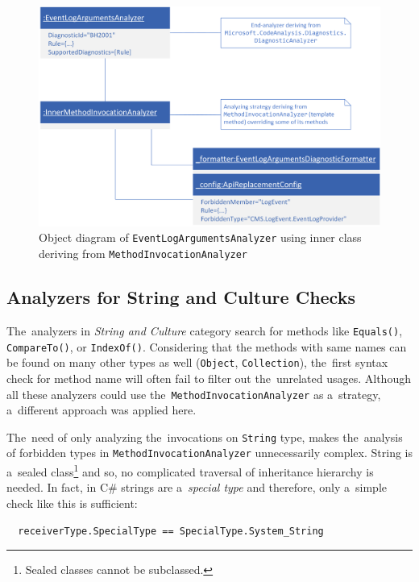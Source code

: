 \documentclass[
  digital, %
  table,   %
  lof,     %
  lot,     %
  oneside,
]{fithesis3}
\begin{document}
\begin{figure}[h!]
		\centering
			\includegraphics[scale=0.75]{img/uml/method-invocation-analyzer-object-diagram}
		\caption{Object diagram of \texttt{EventLogArgumentsAnalyzer} using inner class deriving from \texttt{MethodInvocationAnalyzer}}
		\label{fig:uml-method-invocation-analyzer-object-diagram}
\end{figure}

\subsection{Analyzers for String and Culture Checks}
\label{sec:string-and-culture-approach-explained}
The~analyzers in \textit{String and Culture} category search for methods like \texttt{Equals()}, \texttt{CompareTo()}, or \texttt{IndexOf()}. Considering that the methods with same names can be found on many other types as well (\texttt{Object}, \texttt{Collection}), the~first syntax check for method name will often fail to filter out the~unrelated usages. Although all these analyzers could use the~\texttt{MethodInvocationAnalyzer} as a~strategy, a~different approach was applied here. 

The~need of only analyzing the~invocations on \texttt{String} type, makes the~analysis of forbidden types in \texttt{MethodInvocationAnalyzer} unnecessarily complex. String is a~sealed class\footnote{Sealed classes cannot be subclassed.} and so, no complicated traversal of inheritance hierarchy is needed. In fact, in C\# strings are a~\textit{special type} and therefore, only a~simple check like this is sufficient:

\begin{verbatim}
  receiverType.SpecialType == SpecialType.System_String
\end{verbatim}
\end{document}
